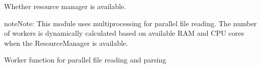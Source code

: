 \documentclass[a4paper,11pt,english,openany,oneside]{sphinxmanual}
\begin{document}

\begin{fulllineitems}
\label{\detokenize{modules/core:core.averager.RESOURCE_MANAGER_AVAILABLE}}
\pysigstartsignatures
\pysigline
{}
\pysigstopsignatures
\sphinxAtStartPar
Whether resource manager is available.
\begin{quote}\begin{description}
\sphinxAtStartPar
{}

\end{description}\end{quote}

\end{fulllineitems}


\begin{sphinxadmonition}{note}{Note:}
\sphinxAtStartPar
This module uses multiprocessing for parallel file reading. The number of
workers is dynamically calculated based on available RAM and CPU cores
when the ResourceManager is available.
\end{sphinxadmonition}

\begin{fulllineitems}
\label{\detokenize{modules/core:core.averager.read_and_parse_file_parallel}}
\pysigstartsignatures
\pysiglinewithargsret
{}
{}
{}
\pysigstopsignatures
\sphinxAtStartPar
Worker function for parallel file reading and parsing

\end{fulllineitems}

\end{document}
